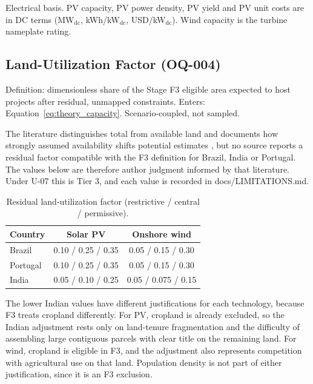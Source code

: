 Electrical basis. PV capacity, PV power density, PV yield and PV unit
costs are in DC terms (MW$_{\mathrm{dc}}$, kWh/kW$_{\mathrm{dc}}$,
USD/kW$_{\mathrm{dc}}$). Wind capacity is the turbine nameplate rating.

\subsection{Land-Utilization Factor (OQ-004)}
\label{subsec:g1_luf}

Definition: dimensionless share of the Stage F3 eligible area expected
to host projects after residual, unmapped constraints. Enters:
Equation~\ref{eq:theory_capacity}. Scenario-coupled, not sampled.

The literature distinguishes total from available land and documents how
strongly assumed availability shifts potential estimates
\cite{lopez2012,ong2013,turkovska2021,turkovska2024}, but no source
reports a residual factor compatible with the F3 definition for Brazil,
India or Portugal. The values below are therefore author judgment
informed by that literature. Under U-07 this is Tier 3, and each value is
recorded in docs/LIMITATIONS.md.

\begin{table}[htbp]
    \centering
    \caption{Residual land-utilization factor (restrictive / central /
    permissive).}
    \label{tab:g1_luf}
    \small
    \begin{tabular}{lcc}
        \toprule
        Country & Solar PV & Onshore wind \\
        \midrule
        Brazil   & 0.10 / 0.25 / 0.35 & 0.05 / 0.15 / 0.30 \\
        Portugal & 0.10 / 0.25 / 0.35 & 0.05 / 0.15 / 0.30 \\
        India    & 0.05 / 0.10 / 0.25 & 0.05 / 0.075 / 0.15 \\
        \bottomrule
    \end{tabular}
\end{table}

The lower Indian values have different justifications for each
technology, because F3 treats cropland differently. For PV, cropland is
already excluded, so the Indian adjustment rests only on land-tenure
fragmentation and the difficulty of assembling large contiguous parcels
with clear title on the remaining land. For wind, cropland is eligible
in F3, and the adjustment also represents competition with agricultural
use on that land. Population density is not part of either
justification, since it is an F3 exclusion.

